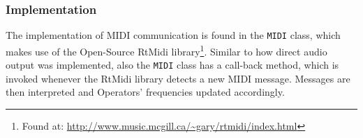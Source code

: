 \subsubsection{Implementation}

The implementation of MIDI communication is found in the \texttt{MIDI} class, which makes use of the Open-Source RtMidi library\footnote{Found at: \url{http://www.music.mcgill.ca/~gary/rtmidi/index.html}}. Similar to how direct audio output was implemented, also the \texttt{MIDI} class has a call-back method, which is invoked whenever the RtMidi library detects a new MIDI message. Messages are then interpreted and Operators' frequencies updated accordingly.
